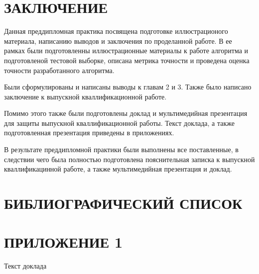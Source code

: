 \documentclass[14pt, a4paper]{extreport}
\begin{document}
\chapter* {ЗАКЛЮЧЕНИЕ} 
	Данная преддипломная практика посвящена подготовке иллюстрационого материала, написанию выводов и заключения по проделанной работе. В ее рамках были подготовленны иллюстрационные материалы к работе алгоритма и подготовленой тестовой выборке, описана метрика точности и проведена оценка точности разработанного алгоритма.
	
	Были сформулированы и написаны выводы к главам 2 и 3. Также было написано заключение к выпускной кваллификационной работе.
	
	Помимо этого также были подготовлены доклад и мультимедийная презентация для защиты выпускной кваллификационной работы. Текст доклада, а также подготовленная презентация приведены в приложениях. 
	
	В результате преддипломной практики были выполнены все поставленные, в следствии чего была полностью подготовлена пояснительная записка к выпускной кваллификацинной работе, а также мультимедийная презентация и доклад.
\chapter* {БИБЛИОГРАФИЧЕСКИЙ СПИСОК} 
	\begin{sortedlist_eng}
	\end{sortedlist_eng}
\chapter* {ПРИЛОЖЕНИЕ 1}
	\vspace{-0.5cm}
	\hspace{5.1cm} Текст доклада
	
\end{document}
